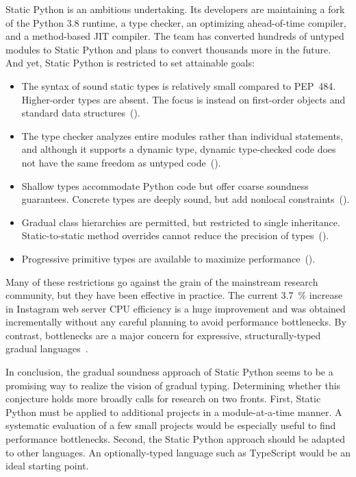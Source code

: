 \documentclass[english,cleveref,crc]{programming}
\newcommand{\SP}{Static Python}
\newcommand{\PEP}{PEP~484}
\newcommand{\CPUchange}{\SI{3.7}{\percent}}
\begin{document}
\SP{} is an ambitious undertaking.
Its developers are maintaining a fork of the Python 3.8 runtime,
a type checker,
an optimizing ahead-of-time compiler,
and a method-based JIT compiler.
The team has converted hundreds of untyped modules to \SP{}
and plans to convert thousands more in the future.
And yet, \SP{} is restricted to set attainable goals:
\begin{itemize}
  \item
    The syntax of sound static types is relatively small compared
    to \PEP{}.
    Higher-order types are absent.
    The focus is instead on first-order objects and standard data structures~().
  \item
    The type checker analyzes entire modules rather than individual statements,
    and although it supports a dynamic type, dynamic type-checked code
    does not have the same freedom as untyped code~().
  \item
    Shallow types accommodate Python code but offer coarse
    soundness guarantees.
    Concrete types are deeply sound, but add nonlocal constraints~().
  \item
    Gradual class hierarchies are permitted, but restricted to single inheritance.
    Static-to-static method overrides cannot reduce the precision of types~().
  \item
    Progressive primitive types are available to maximize performance~().
\end{itemize}
%
Many of these restrictions go against the grain of the mainstream
research community, but they have been effective in practice.
The current \CPUchange{} increase in Instagram web server CPU efficiency is a huge improvement
and was obtained incrementally without any careful planning to avoid performance bottlenecks.
By contrast, bottlenecks are a major concern for expressive, structurally-typed
gradual languages~\cite{gtnffvf-jfp-2019,tfgnvf-popl-2016}.

In conclusion, the gradual soundness approach of \SP{} seems to be a promising
way to realize the vision of gradual typing.
Determining whether this conjecture holds more broadly
calls for research on two fronts.
First, \SP{} must be applied to additional projects in a module-at-a-time manner.
A systematic evaluation of a few small projects would be
especially useful to find performance bottlenecks.
Second, the \SP{} approach should be adapted to other languages.
An optionally-typed language such as TypeScript would be an ideal starting
point.
\end{document}
